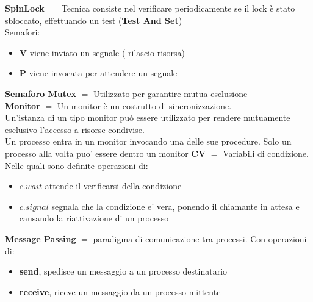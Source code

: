 \documentclass{article}
\begin{document}
\textbf{SpinLock} $=$ Tecnica consiste nel verificare periodicamente se il lock è stato sbloccato, effettuando un test (\textbf{Test And Set})\\
Semafori:
\begin{itemize}
  \item \textbf{V} viene inviato un segnale ( rilascio risorsa)
  \item \textbf{P} viene invocata per attendere un segnale
\end{itemize}
\textbf{Semaforo Mutex} $=$ Utilizzato per garantire mutua esclusione\\
\textbf{Monitor} $=$ Un monitor è un costrutto di sincronizzazione. \\
Un'istanza di un tipo monitor può essere utilizzato per rendere mutuamente esclusivo l'accesso a risorse condivise.\\
Un processo entra in un monitor invocando una delle sue procedure. Solo un processo alla volta puo' essere dentro un monitor
\textbf{CV} $=$ Variabili di condizione. Nelle quali sono definite operazioni di:
\begin{itemize}
  \item $c.wait$ attende il verificarsi della condizione
  \item $c.signal$ segnala che la condizione e' vera, ponendo il chiamante in attesa e causando la riattivazione di un processo
\end{itemize}
\textbf{Message Passing} $=$ paradigma di comunicazione tra processi. Con operazioni di:
\begin{itemize}
  \item \textbf{send}, spedisce un messaggio a un processo destinatario
  \item \textbf{receive}, riceve un messaggio da un processo mittente
\end{itemize}
\end{document}
